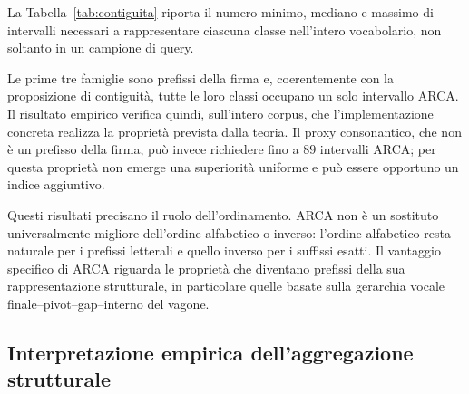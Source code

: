 \documentclass[11pt,a4paper]{article}
\theoremstyle{definition}
\theoremstyle{remark}
\begin{document}
La Tabella~\ref{tab:contiguita} riporta il numero minimo, mediano e massimo di intervalli necessari a rappresentare ciascuna classe nell'intero vocabolario, non soltanto in un campione di query.

\begin{table}[htbp]
\centering
\caption{Contiguità delle classi sperimentali nei tre ordini. Le terne indicano minimo/mediana/massimo del numero di intervalli per classe.}
\label{tab:contiguita}
\end{table}

Le prime tre famiglie sono prefissi della firma e, coerentemente con la proposizione di contiguità, tutte le loro classi occupano un solo intervallo ARCA. Il risultato empirico verifica quindi, sull'intero corpus, che l'implementazione concreta realizza la proprietà prevista dalla teoria. Il proxy consonantico, che non è un prefisso della firma, può invece richiedere fino a $89$ intervalli ARCA; per questa proprietà non emerge una superiorità uniforme e può essere opportuno un indice aggiuntivo.

Questi risultati precisano il ruolo dell'ordinamento. ARCA non è un sostituto universalmente migliore dell'ordine alfabetico o inverso: l'ordine alfabetico resta naturale per i prefissi letterali e quello inverso per i suffissi esatti. Il vantaggio specifico di ARCA riguarda le proprietà che diventano prefissi della sua rappresentazione strutturale, in particolare quelle basate sulla gerarchia vocale finale--pivot--gap--interno del vagone.

\subsection{Interpretazione empirica dell'aggregazione strutturale}
\end{document}
